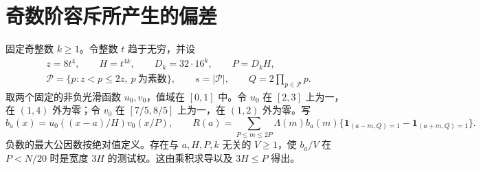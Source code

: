 \documentclass[UTF8,a4paper,11pt,fontset=windows]{ctexart}
\newcommand{\Lam}{\Lambda}
\newcommand{\ind}{\mathbf 1}
\begin{document}
\section{奇数阶容斥所产生的偏差}
固定奇整数 \(k\ge1\)。令整数 \(t\) 趋于无穷，并设
\[
 \begin{gathered}
 z=8t^4,\qquad H=t^{4k},\qquad D_k=32\cdot16^k,\qquad P=D_kH,\\
 \mathcal P=\{p:z<p\le2z,\ p\ \text{为素数}\},\qquad
 s=|\mathcal P|,\qquad Q=2\prod_{p\in\mathcal P}p .
 \end{gathered}
\]
取两个固定的非负光滑函数 \(u_0,v_0\)，值域在 \([0,1]\) 中。令 \(u_0\) 在 \([2,3]\) 上为一，在 \((1,4)\) 外为零；令 \(v_0\) 在 \([7/5,8/5]\) 上为一，在 \((1,2)\) 外为零。写
\[
 b_a(x)=u_0((x-a)/H)v_0(x/P),\qquad
 R(a)=\sum_{P\le m\le 2P}\Lam(m)b_a(m)
          \{\ind_{(a-m,Q)=1}-\ind_{(a+m,Q)=1}\}.
\]
负数的最大公因数按绝对值定义。存在与 \(a,H,P,k\) 无关的 \(V\ge1\)，使 \(b_a/V\) 在 \(P<N/20\) 时是宽度 \(3H\) 的测试权。这由乘积求导以及 \(3H\le P\) 得出。
\end{document}
